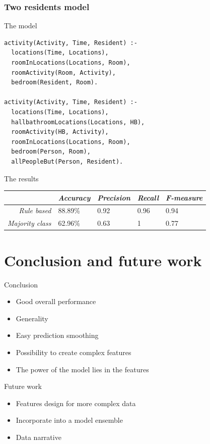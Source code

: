 \documentclass[10pt]{beamer}
\begin{document}
\begin{frame}
  \frametitle{Two residents model}

  \begin{block}{The model}
\begin{verbatim}
activity(Activity, Time, Resident) :-
  locations(Time, Locations),
  roomInLocations(Locations, Room),
  roomActivity(Room, Activity),
  bedroom(Resident, Room).

activity(Activity, Time, Resident) :-
  locations(Time, Locations),
  hallbathroomLocations(Locations, HB),
  roomActivity(HB, Activity),
  roomInLocations(Locations, Room),
  bedroom(Person, Room),
  allPeopleBut(Person, Resident).
\end{verbatim}
  \end{block}

  \begin{block}{The results}
    \begin{tabular}{ r | l l l l }
    \centering
     & \emph{Accuracy} & \emph{Precision} & \emph{Recall} & \emph{F-measure}\\
    \hline
     \emph{Rule based} & 88.89\% & 0.92 & 0.96 & 0.94 \\
     \emph{Majority class} & 62.96\% & 0.63 & 1 & 0.77\\
    \end{tabular}
  \end{block}

\end{frame} 

\section{Conclusion and future work}
\begin{frame}

  \begin{block}{Conclusion}
    \begin{itemize}
      \item Good overall performance
      \item Generality
      \item Easy prediction smoothing
      \item Possibility to create complex features
      \item The power of the model lies in the features
    \end{itemize}
  \end{block}

  \begin{block}{Future work}
    \begin{itemize}
      \item Features design for more complex data
      \item Incorporate into a model ensemble
      \item Data narrative
    \end{itemize}
  \end{block}

\end{frame}
\end{document}
